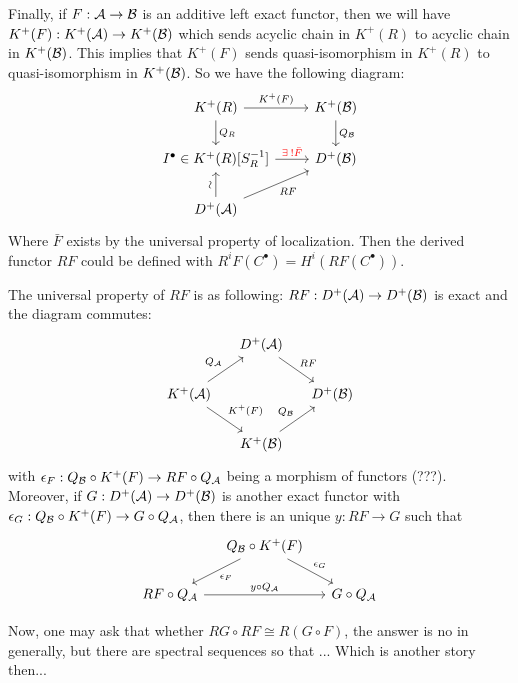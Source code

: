 Finally, if $F: \mathcal{A} \to \mathcal{B}$ is an additive left exact functor, then
we will have $K^+(F): K^+(\mathcal{A}) \to K^+(\mathcal{B})$ which
sends acyclic chain in $K^+(R)$ to acyclic chain in $K^+(\mathcal{B})$.
This implies that $K^+(F)$ sends quasi-isomorphism in
$K^+(R)$ to quasi-isomorphism in $K^+(\mathcal{B})$. So
we have the following diagram:
\[ \begin{tikzcd}
  K^+(R) \ar[r, "K^+(F)"] \ar[d, "Q_R"] & K^+(\Bc) \ar[d, "Q_\Bc"] \\
  I^\bullet \in K^+(R)[S_R^{-1}] \ar[r, "{\color{red} \exists ! \bar{F}}"] & D^+(\Bc) \\
    D^+(\Ac) \ar[u, "\rotatebox{90}{\(\sim\)}"] \ar[ru, "RF"']
\end{tikzcd} \]
Where $\bar{F}$ exists by the universal property of localization.
Then the derived functor $RF$ could be defined with $R^i F(C^\bullet) = H^i(RF(C^\bullet))$.

The universal property of $RF$ is as following:
$RF : D^+(\mathcal{A}) \to D^+(\mathcal{B})$ is exact and the diagram commutes:
\[ \begin{tikzcd}[column sep=small]
  & D^+(\Ac) \ar[rd, "RF"] & \\
  K^+(\Ac) \ar[ru, "Q_\Ac"] \ar[rd, "K^+(F)"] & & D^+(\Bc) \\
  & K^+(\Bc) \ar[ru, "Q_\Bc"] &
\end{tikzcd} \]
with $\epsilon_F: Q_{\mathcal{B}} \circ K^+(F) \to RF \circ Q_{\mathcal{A}}$ being
a morphism of functors (???). \\
Moreover, if $G : D^+(\mathcal{A}) \to D^+(\mathcal{B})$ is another exact functor
with $\epsilon_G : Q_{\mathcal{B}} \circ K^+(F) \to G \circ Q_{\mathcal{A}}$,
then there is an unique $y: RF \to G$ such that
\[ \begin{tikzcd}[column sep=small]
  & Q_\Bc \circ K^+(F) \ar[ld, "\epsilon_F"] \ar[rd, "\epsilon_G"] & \\
  RF \circ Q_\Ac \ar[rr, "y \circ Q_\Ac"] & & G \circ Q_\Ac
\end{tikzcd} \]

Now, one may ask that whether $RG \circ RF \cong R(G \circ F)$,
the answer is no in generally, but there are spectral sequences so that ...
Which is another story then...
